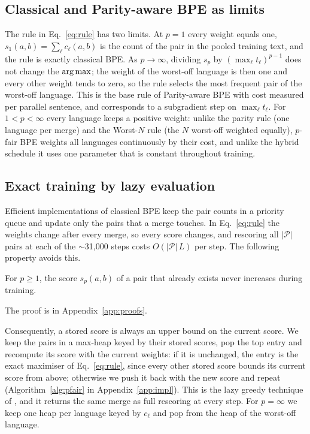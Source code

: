 \subsection{Classical and Parity-aware BPE as limits}
\label{sec:limits}

The rule in Eq.~\eqref{eq:rule} has two limits. At $p=1$ every weight equals one,
$s_1(a,b)=\sum_\ell c_\ell(a,b)$ is the count of the pair in the pooled training text, and
the rule is exactly classical BPE. As $p\to\infty$, dividing $s_p$ by
$(\max_\ell t_\ell)^{p-1}$ does not change the $\operatorname*{arg\,max}$; the weight of the worst-off
language is then one and every other weight tends to zero, so the rule selects the most
frequent pair of the worst-off language. This is the base rule of Parity-aware BPE
\citep{foroutan2026} with cost measured per parallel sentence, and corresponds to a
subgradient step on $\max_\ell t_\ell$. For $1<p<\infty$ every language keeps a positive weight: unlike the parity rule (one language
per merge) and the Worst-$N$ rule \citep{kanjirangat2026} (the $N$ worst-off weighted
equally), $p$-fair BPE weights all languages continuously by their cost, and unlike the
hybrid schedule \citep{foroutan2026} it uses one parameter that is constant throughout
training.

\subsection{Exact training by lazy evaluation}
\label{sec:lazy}

Efficient implementations of classical BPE keep the pair counts in a priority queue and
update only the pairs that a merge touches. In Eq.~\eqref{eq:rule} the weights change after
every merge, so every score changes, and rescoring all $|\mathcal{P}|$ pairs at each of the
$\sim$31{,}000 steps costs $O(|\mathcal{P}|\,L)$ per step. The following property avoids this.

\begin{proposition}
\label{prop:lazy}
For $p\ge1$, the score $s_p(a,b)$ of a pair that already exists never increases during
training.
\end{proposition}
The proof is in Appendix~\ref{app:proofs}.


Consequently, a stored score is always an upper bound on the current score. We keep the
pairs in a max-heap keyed by their stored scores, pop the top entry and recompute its score
with the current weights: if it is unchanged, the entry is the exact maximiser of
Eq.~\eqref{eq:rule}, since every other stored score bounds its current score from above;
otherwise we push it back with the new score and repeat (Algorithm~\ref{alg:pfair} in
Appendix~\ref{app:impl}). This is the lazy greedy technique of \citet{minoux1978}, and it
returns the same merge as full rescoring at every step. For $p=\infty$ we keep one heap per
language keyed by $c_\ell$ and pop from the heap of the worst-off language.
